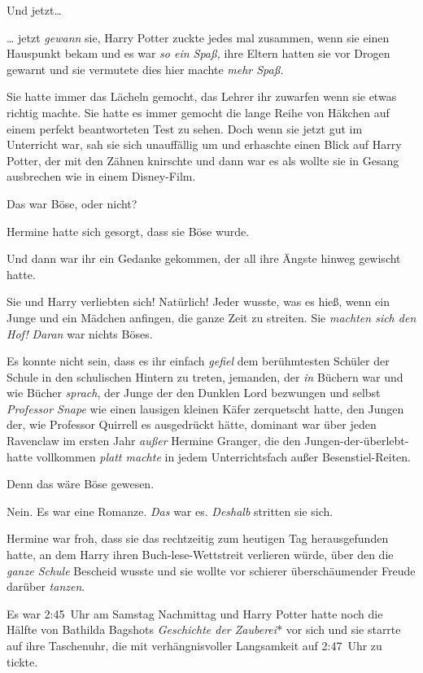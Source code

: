 {Und jetzt…

… jetzt \emph{gewann} sie, Harry Potter zuckte jedes mal zusammen, wenn sie einen Hauspunkt bekam und es war \emph{so ein Spaß,} ihre Eltern hatten sie vor Drogen gewarnt und sie vermutete dies hier machte \emph{mehr Spaß.}

Sie hatte immer das Lächeln gemocht, das Lehrer ihr zuwarfen wenn sie etwas richtig machte. Sie hatte es immer gemocht die lange Reihe von Häkchen auf einem perfekt beantworteten Test zu sehen. Doch wenn sie jetzt gut im Unterricht war, sah sie sich unauffällig um und erhaschte einen Blick auf Harry Potter, der mit den Zähnen knirschte und dann war es als wollte sie in Gesang ausbrechen wie in einem Disney-Film.

Das war Böse, oder nicht?

Hermine hatte sich gesorgt, dass sie Böse wurde.

Und dann war ihr ein Gedanke gekommen, der all ihre Ängste hinweg gewischt hatte.

Sie und Harry verliebten sich! Natürlich! Jeder wusste, was es hieß, wenn ein Junge und ein Mädchen anfingen, die ganze Zeit zu streiten. Sie \emph{machten sich den Hof!} \emph{Daran} war nichts Böses.

Es konnte nicht sein, dass es ihr einfach \emph{gefiel} dem berühmtesten Schüler der Schule in den schulischen Hintern zu treten, jemanden, der \emph{in} Büchern war und wie Bücher \emph{sprach}, der Junge der den Dunklen Lord bezwungen und selbst \emph{Professor Snape} wie einen lausigen kleinen Käfer zerquetscht hatte, den Jungen der, wie Professor Quirrell es ausgedrückt hätte, dominant war über jeden Ravenclaw im ersten Jahr \emph{außer} Hermine Granger, die den Jungen-der-überlebt-hatte vollkommen \emph{platt machte} in jedem Unterrichtsfach außer Besenstiel-Reiten.

Denn das wäre Böse gewesen.

Nein. Es war eine Romanze. \emph{Das} war es. \emph{Deshalb} stritten sie sich.

Hermine war froh, dass sie das rechtzeitig zum heutigen Tag herausgefunden hatte, an dem Harry ihren Buch-lese-Wettstreit verlieren würde, über den die \emph{ganze Schule} Bescheid wusste und sie wollte vor schierer überschäumender Freude darüber \emph{tanzen}.

Es war 2:45~Uhr am Samstag Nachmittag und Harry Potter hatte noch die Hälfte von Bathilda Bagshots \emph{Geschichte der Zauberei}* vor sich und sie starrte auf ihre Taschenuhr, die mit verhängnisvoller Langsamkeit auf 2:47~Uhr zu tickte.

}
